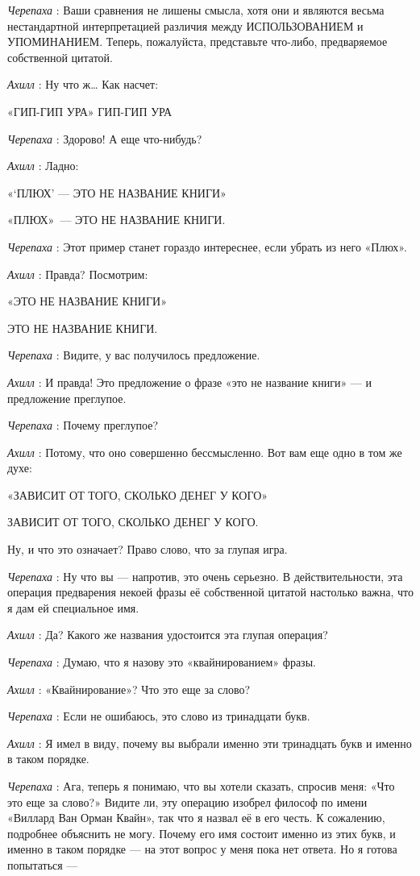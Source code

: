\documentclass[../main.tex]{subfiles}
\begin{document}
\begin{dialogue}
\emph{Черепаха} : Ваши сравнения не лишены смысла, хотя они и являются весьма нестандартной интерпретацией различия между ИСПОЛЬЗОВАНИЕМ и УПОМИНАНИЕМ. Теперь, пожалуйста, представьте что-либо, предваряемое собственной цитатой.

\emph{Ахилл} : Ну что ж\ldots{} Как насчет:

«ГИП-ГИП УРА» ГИП-ГИП УРА

\emph{Черепаха} : Здорово! А еще что-нибудь?

\emph{Ахилл} : Ладно:

«\enquote*{ПЛЮХ} --- ЭТО НЕ НАЗВАНИЕ КНИГИ»

«ПЛЮХ»~--- ЭТО НЕ НАЗВАНИЕ КНИГИ.

\emph{Черепаха} : Этот пример станет гораздо интереснее, если убрать из него «Плюх».

\emph{Ахилл} : Правда? Посмотрим:

«ЭТО НЕ НАЗВАНИЕ КНИГИ»

ЭТО НЕ НАЗВАНИЕ КНИГИ.

\emph{Черепаха} : Видите, у вас получилось предложение.

\emph{Ахилл} : И правда! Это предложение о фразе «это не название книги» --- и предложение преглупое.

\emph{Черепаха} : Почему преглупое?

\emph{Ахилл} : Потому, что оно совершенно бессмысленно. Вот вам еще одно в том же духе:

«ЗАВИСИТ ОТ ТОГО, СКОЛЬКО ДЕНЕГ У КОГО»

ЗАВИСИТ ОТ ТОГО, СКОЛЬКО ДЕНЕГ У КОГО.

Ну, и что это означает? Право слово, что за глупая игра.

\emph{Черепаха} : Ну что вы --- напротив, это очень серьезно. В действительности, эта операция предварения некоей фразы её собственной цитатой настолько важна, что я дам ей специальное имя.

\emph{Ахилл} : Да? Какого же названия удостоится эта глупая операция?

\emph{Черепаха} : Думаю, что я назову это «квайнированием» фразы.

\emph{Ахилл} : «Квайнирование»? Что это еще за слово?

\emph{Черепаха} : Если не ошибаюсь, это слово из тринадцати букв.

\emph{Ахилл} : Я имел в виду, почему вы выбрали именно эти тринадцать букв и именно в таком порядке.

\emph{Черепаха} : Ага, теперь я понимаю, что вы хотели сказать, спросив меня: «Что это еще за слово?» Видите ли, эту операцию изобрел философ по имени «Виллард Ван Орман Квайн», так что я назвал её в его честь. К сожалению, подробнее объяснить не могу. Почему его имя состоит именно из этих букв, и именно в таком порядке --- на этот вопрос у меня пока нет ответа. Но я готова попытаться ---


\end{dialogue}
\end{document}
